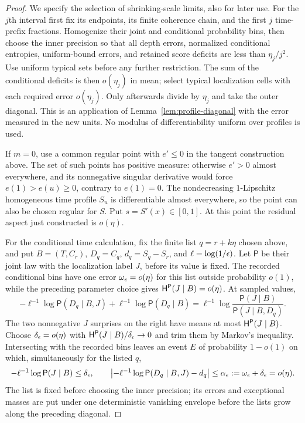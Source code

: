 \begin{proof}
We specify the selection of shrinking-scale limits, also for later use.
For the $j$th interval first fix its endpoints, its finite coherence
chain, and the first $j$ time-prefix fractions.  Homogenize their joint
and conditional probability bins, then choose the inner precision so
that all depth errors, normalized conditional entropies, uniform-bound
errors, and retained score deficits are less than $\eta_j/j^2$.
Use uniform typical sets before any further restriction.
The sum of the conditional deficits is then $o(\eta_j)$ in mean;
select typical localization cells with each required error
$o(\eta_j)$.  Only afterwards divide by $\eta_j$ and take the outer
diagonal.  This is an application of
Lemma~\ref{lem:profile-diagonal} with the error measured in the new
units.  No modulus of differentiability uniform over profiles is used.

 If $m=0$, use a common regular point with $e'\le0$ in the tangent
 construction above.  The set of such points has positive measure:
 otherwise $e'>0$ almost everywhere, and its nonnegative singular
 derivative would force $e(1)>e(u)\ge0$, contrary to $e(1)=0$.
 The nondecreasing $1$-Lipschitz homogeneous time profile $S_u$ is
 differentiable almost everywhere, so the point can also be chosen
 regular for $S$.  Put $s=S'(x)\in[0,1]$.  At this point the residual
 aspect just constructed is $o(\eta)$.

For the conditional time calculation, fix the finite list
$q=r+k\eta$ chosen above, and put $B=(T,C_r)$, $D_q=C_q$,
$d_q=S_q-S_r$, and $\ell=\log(1/\epsilon)$.  Let $\mathsf P$ be their
joint law with the localization label $J$, before its value is fixed.
The recorded conditional bins have one error $\omega_\epsilon=o(\eta)$
for this list outside probability $o(1)$, while the preceding parameter
choice gives $\mathsf H^{\mathsf P}(J\mid B)=o(\eta)$.  At sampled values,
\[
 -\ell^{-1}\log\mathsf P(D_q\mid B,J)
 +\ell^{-1}\log\mathsf P(D_q\mid B)
 =\ell^{-1}\log
       \frac{\mathsf P(J\mid B)}{\mathsf P(J\mid B,D_q)}.
\]
The two nonnegative $J$ surprises on the right have means at most
$\mathsf H^{\mathsf P}(J\mid B)$.  Choose $\delta_\epsilon=o(\eta)$ with
$\mathsf H^{\mathsf P}(J\mid B)/\delta_\epsilon\to0$ and trim them by Markov's
inequality.  Intersecting with the recorded bins leaves an event $E$ of
probability $1-o(1)$ on which, simultaneously for the listed $q$,
\[
 -\ell^{-1}\log\mathsf P(J\mid B)\le\delta_\epsilon,\qquad
 \left|-\ell^{-1}\log\mathsf P(D_q\mid B,J)-d_q\right|
       \le\alpha_\epsilon:=\omega_\epsilon+\delta_\epsilon=o(\eta).
\]
The list is fixed before choosing the inner precision; its errors and
exceptional masses are put under one deterministic vanishing envelope
before the lists grow along the preceding diagonal.


\end{proof}
